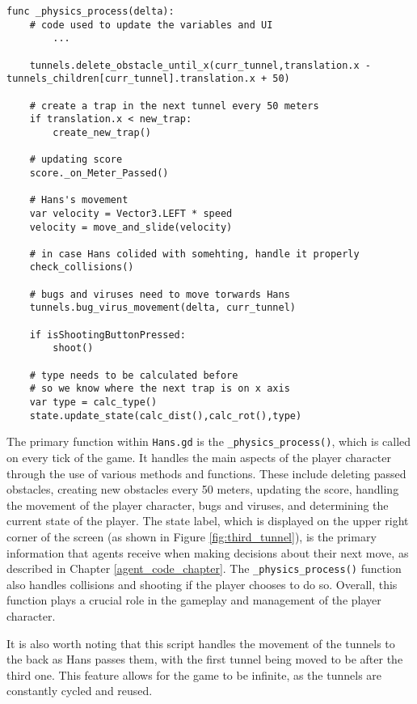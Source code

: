 \begin{lstlisting}
func _physics_process(delta): 
	# code used to update the variables and UI
		...
			
    tunnels.delete_obstacle_until_x(curr_tunnel,translation.x - tunnels_children[curr_tunnel].translation.x + 50)
    
    # create a trap in the next tunnel every 50 meters
    if translation.x < new_trap:
        create_new_trap()
    
    # updating score 
    score._on_Meter_Passed()
    
    # Hans's movement
    var velocity = Vector3.LEFT * speed
    velocity = move_and_slide(velocity)
    
    # in case Hans colided with somehting, handle it properly
    check_collisions()
    
    # bugs and viruses need to move torwards Hans    
    tunnels.bug_virus_movement(delta, curr_tunnel)
    
    if isShootingButtonPressed:
        shoot()
        
    # type needs to be calculated before 
    # so we know where the next trap is on x axis
    var type = calc_type()
    state.update_state(calc_dist(),calc_rot(),type)
\end{lstlisting}

The primary function within \texttt{Hans.gd} is the \texttt{\_physics\_process()}, which is called on every tick of the game. It handles the main aspects of the player character through the use of various methods and functions. These include deleting passed obstacles, creating new obstacles every 50 meters, updating the score, handling the movement of the player character, bugs and viruses, and determining the current state of the player. The state label, which is displayed on the upper right corner of the screen (as shown in Figure \ref{fig:third_tunnel}), is the primary information that agents receive when making decisions about their next move, as described in Chapter \ref{agent_code_chapter}. The \texttt{\_physics\_process()} function also handles collisions and shooting if the player chooses to do so. Overall, this function plays a crucial role in the gameplay and management of the player character.

It is also worth noting that this script handles the movement of the tunnels to the back as Hans passes them, with the first tunnel being moved to be after the third one. This feature allows for the game to be infinite, as the tunnels are constantly cycled and reused.

